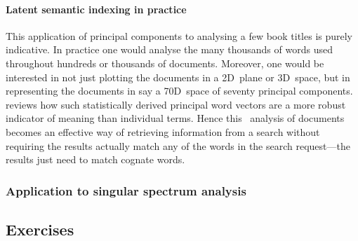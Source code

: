 \paragraph{Latent semantic indexing in practice}
This application of principal components to analysing a few book titles is purely indicative.
In practice one would analyse the many thousands of words used throughout hundreds or thousands of documents. 
Moreover, one would be interested in not just plotting the documents in a 2D~plane or 3D~space, but in representing the documents in say a 70D~space of seventy principal components.
\cite{Berry95} reviews how such statistically derived principal word vectors are a more robust indicator of meaning than individual terms.  
Hence this \svd\ analysis of documents becomes an effective way of retrieving information from a search without requiring the results actually match any of the words in the search request---the results just need to match cognate words.









\begin{draft}
\subsubsection {Application to singular spectrum analysis}
\label{sec:ssa}

\begin{comment}
Follow up \autoref{eg:orthbapp} on the \textsc{soi} to introduce the use of singular spectrum analysis. 
\end{comment}

\end{draft}









\subsection{Exercises}


